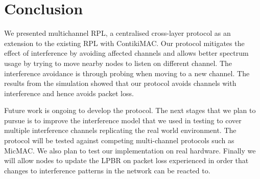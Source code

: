 \section{Conclusion}
\label{sec:conclusion}


We presented multichannel RPL, a centralised cross-layer protocol as an extension to the existing RPL with ContikiMAC. Our protocol mitigates the effect of interference by avoiding affected channels and allows better spectrum usage by trying to move nearby nodes to listen on different channel.  The interference avoidance is through probing when moving to a new channel. The results from the simulation showed that our protocol avoids channels with interference and hence avoids packet loss.

Future work is ongoing to develop the protocol. The next stages that we plan to pursue is to improve the interference model that we used in testing to cover multiple interference channels replicating the real world environment. The protocol will be tested against competing multi-channel protocols such as MicMAC. We also plan to test our implementation on real hardware.  Finally we will allow nodes to update the LPBR on packet loss experienced in order that changes to interference patterns in the network can be reacted to.


